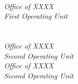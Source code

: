\begin{titlepage}
\begin{flushright}
\LARGE{}\\
\LARGE{\sffamily{\textbf{\pubnumber}}}\\
\vfill
\Huge{\sffamily{\textbf{\pubtitle}}}\\
\Large{\sffamily{\textit{\pubsubtitle}}}\\
\vfill
\normalsize \authorone\\
\authortwo\\
\authorthree\\
\authorfour\\
\textit{Office of XXXX}\\
\textit{First Operating Unit}\\
\vspace{12pt}
\authorfive\\
\authorsix\\
\textit{Office of XXXX}\\
\textit{Second Operating Unit}\\
\vspace{12pt}
\textit{Office of XXXX}\\
\textit{Second Operating Unit}\\
\vfill

\end{flushright}
\end{titlepage}

